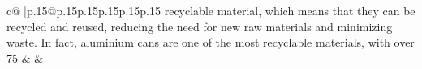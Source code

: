 \documentclass{article}
\begin{document}
{\begin{supertabular}{c@{$\;$}|p{.15\linewidth}@{}p{.15\linewidth}p{.15\linewidth}p{.15\linewidth}p{.15\linewidth}p{.15\linewidth}}
{{{recyclable material, which means that they can be recycled and reused, reducing the need for new raw materials and minimizing waste. In fact, aluminium cans are one of the most recyclable materials, with over 75%
	  } 
	   } 
	   } 
	 & & \\ 
 

    \theutterance {}  


\end{supertabular}}
\end{document}
